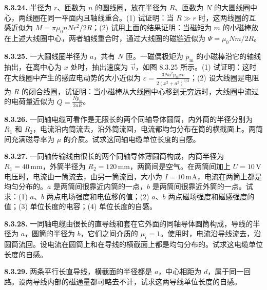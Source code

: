 \vfill
\newpage

\textbf{8.3.24.} 半径为 $r$、匝数为 $n$ 的圆线圈，放在半径为 $R$、匝数为 $N$ 的大圆线圈中心，两线圈在同一平面内且轴线重合。(1) 试证明：当 $R \gg r$ 时，这两线圈的互感近似为 $M = \pi \mu_0 n N r^2 / 2R$；(2) 试用上面的结果证明：当磁矩为 $m$ 的小磁棒放在上述大线圈中心，两者轴线重合时，通过大线圈的磁链近似为 $\Psi = \mu_0 N m / 2R$。

\vfill
\newpage

\textbf{8.3.25.} 一大圆线圈半径为 $a$，共有 $N$ 匝。一磁偶极矩为 $p_{\mathrm{m}}$ 的小磁棒沿它的轴线抽出，在离中心为 $x$ 处时，抽出速度为 $\vec{v}$，如图 8.3.25 所示。(1) 试证明：这时在大线圈中产生的感应电动势的大小近似为 $\displaystyle \varepsilon = \frac{3Na^{2}p_{\mathrm{m}}xv}{2(x^{2}+a^{2})^{3/2}}$；(2) 设大线圈是电阻为 $R$ 的闭合线圈，试证明：当小磁棒从大线圈中心移到无穷远时，大线圈中流过的电荷量近似为 $\displaystyle Q = \frac{Np_{\mathrm{m}}}{2aR}$。

\begin{center}
\end{center}

\vfill
\newpage

\textbf{8.3.26.} 一同轴电缆可看作是无限长的两个同轴导体圆筒，内外筒的半径分别为 $R_{1}$ 和 $R_{2}$，电流沿内筒流去，沿外筒流回，电流都均匀分布在筒的横截面上。两筒间充满磁导率为 $\mu$ 的介质。试求这同轴电缆单位长度的自感。

\vfill
\newpage

\textbf{8.3.27.} 一同轴传输线由很长的两个同轴导体薄圆筒构成，内筒半径为 $R_{1} = 40\,\mathrm{mm}$，外筒半径为 $R_{2} = 120\,\mathrm{mm}$，两筒间是空气。在两筒间加上 $U = 10\,\mathrm{V}$ 电压时，电流由一筒流去，由另一筒流回，大小为 $I = 10\,\mathrm{mA}$，电流在两筒上都是均匀分布的。$a$ 是两筒间很靠近内筒的一点，$b$ 是两筒间很靠近外筒的一点。试求：(1) $a$、$b$ 两点电场强度和电位移的值；(2) $a$、$b$ 两点磁场强度和磁感强度的值；(3) 单位长度的电容；(4) 单位长度的自感。

\vfill
\newpage

\textbf{8.3.28.} 一同轴电缆由很长的直导线和套在它外面的同轴导体圆筒构成，导线的半径为 $a$，圆筒的半径为 $b$，它们之间介质的 $\mu_{\mathrm{r}} = 1$。使用时，电流沿导线流去，沿圆筒流回。设电流在圆筒上和在导线的横截面上都是均匀分布的。试求这电缆单位长度的自感。

\vfill
\newpage

\textbf{8.3.29.} 两条平行长直导线，横截面的半径都是 $a$，中心相距为 $d$，属于同一回路。设两导线内部的磁通量都可略去不计，试求这两导线单位长度的自感。

